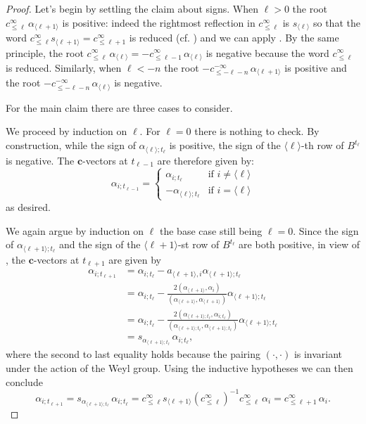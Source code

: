 \documentclass[12pt]{amsart}
\newcommand{\bfc}{\mathbf{c}}
\newcommand{\cv}{\alpha}
\renewcommand{\mod}[1]{\langle {#1} \rangle}
\newcommand{\Zidx}{\ell}
\theoremstyle{remark}
\numberwithin{equation}{section}
\numberwithin{figure}{section}
\begin{document}
\begin{proof}
  Let's begin by settling the claim about signs.
  When $\Zidx>0$ the root $c^\infty_{\le\Zidx}\, \alpha_{\mod{\Zidx+1}}$ is positive: indeed the rightmost reflection in $c^\infty_{\le\Zidx}$ is $s_{\mod{\Zidx}}$ so that the word $c^\infty_{\le\Zidx}s_{\mod{\Zidx+1}}=c^\infty_{\le\Zidx+1}$ is reduced (cf. \cite{Spe09}) and we can apply \cite[VI \S 1.6, Corollary 2 of Proposition 17]{Bou02}.
  By the same principle, the root $c^\infty_{\le\Zidx}\, \alpha_{\mod{\Zidx}} = -c^\infty_{\le\Zidx-1}\, \alpha_{\mod{\Zidx}}$ is negative because the word $c^\infty_{\le\Zidx}$ is reduced.
  Similarly, when $\Zidx<-n$ the root $-c^{-\infty}_{\le-\Zidx-n}\, \alpha_{\mod{\Zidx+1}}$ is positive and the root $-c^{-\infty}_{\le-\Zidx-n}\, \alpha_{\mod{\Zidx}}$ is negative.
  
  For the main claim there are three cases to consider.

  \noindent{\bf Case $-n \leq \Zidx \leq 0$.}
  We proceed by induction on $\Zidx$.
  For $\Zidx=0$ there is nothing to check.
  By construction, while the sign of $\cv_{\mod{\Zidx};t_\Zidx}$ is positive, the sign of the $\mod{\Zidx}$-th row of $B^{t_\Zidx}$ is negative.
  The $\bfc$-vectors at $t_{\Zidx-1}$ are therefore given by:
  \begin{equation*}
    \cv_{i;t_{\Zidx-1}}
    =
    \begin{cases}
      \cv_{i;t_\Zidx} & \text{if $i\neq \mod{\Zidx}$}\\
      -\cv_{\mod{\Zidx};t_\Zidx} & \text{if $i = \mod{\Zidx}$}
    \end{cases}
  \end{equation*}
  as desired.

  \noindent{\bf Case $\Zidx > 0$.}
  We again argue by induction on $\Zidx$ the base case still being $\Zidx=0$.
  Since the sign of $\cv_{\mod{\Zidx+1};t_\Zidx}$ and the sign of the $\mod{\Zidx+1}$-st row of $B^{t_\Zidx}$ are both positive, in view of \cite[Proposition 1.3]{NZ12}, the $\bfc$-vectors at $t_{\Zidx+1}$ are given by
  \begin{align*}
    \cv_{i;t_{\Zidx+1}} 
    &= 
    \cv_{i;t_\Zidx} - a_{\mod{\Zidx+1},i} \cv_{\mod{\Zidx+1};t_\Zidx}\\
    &=
    \cv_{i;t_\Zidx} - \frac{2(\alpha_{\mod{\Zidx+1}},\alpha_i)}{(\alpha_{\mod{\Zidx+1}},\alpha_{\mod{\Zidx+1}})} \cv_{\mod{\Zidx+1};t_\Zidx}\\
    &=
    \cv_{i;t_\Zidx} - \frac{2(\cv_{\mod{\Zidx+1};t_\Zidx},\cv_{i;t_\Zidx})}{(\cv_{\mod{\Zidx+1};t_\Zidx},\cv_{\mod{\Zidx+1};t_\Zidx})} \cv_{\mod{\Zidx+1};t_\Zidx}\\
    &=
    s_{\cv_{\mod{\Zidx+1};t_\Zidx}}\, \cv_{i;t_\Zidx},
  \end{align*}
  where the second to last equality holds because the pairing $(\cdot,\cdot)$ is invariant under the action of the Weyl group.
  Using the inductive hypotheses we can then conclude
  \[
    \cv_{i;t_{\Zidx+1}} 
    =
    s_{\cv_{\mod{\Zidx+1};t_\Zidx}}\, \cv_{i;t_\Zidx}
    =
    c^\infty_{\le\Zidx} s_{\mod{\Zidx+1}} \left(c^\infty_{\le\Zidx}\right)^{-1} c^\infty_{\le\Zidx}\, \alpha_i
    = 
    c^\infty_{\le\Zidx+1}\, \alpha_i.
  \]


\end{proof}
\end{document}
